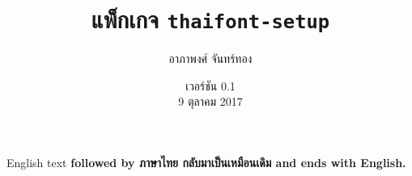 \documentclass[11pt]{ltxguide}
\title{แพ็ก{\wbr}เก{\wbr}จ \textlatin{\texttt{thaifont-setup}}}
\author{อาภา{\wbr}พงศ์ จันทร์{\wbr}ทอง}
\date{เวอร์ชัน 0.1\\9 ตุลาคม 2017}
\begin{document}
\maketitle

\latintext
English text
\bfseries
followed by
\thaitext
ภาษา{\wbr}ไทย{\wbr}
\mdseries
กลับ{\wbr}มา{\wbr}เป็น{\wbr}เหมือน{\wbr}เดิม{\wbr}
\latintext
and ends with English.
\end{document}
